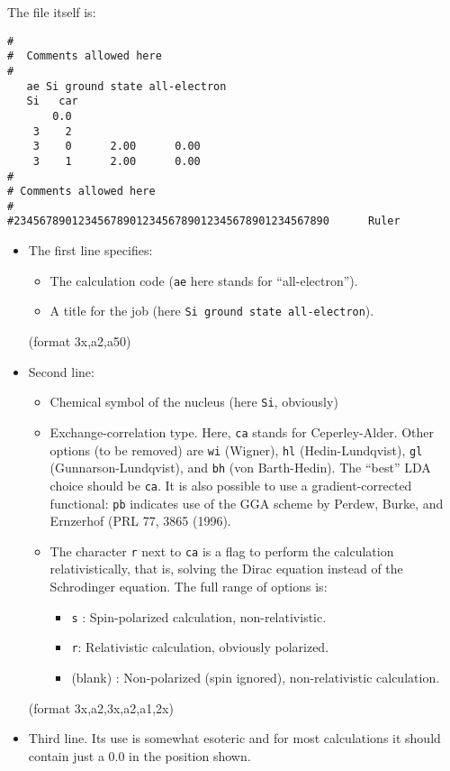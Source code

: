 \documentclass[11pt]{article}
\begin{document}
The file itself is:
\begin{verbatim}
#
#  Comments allowed here
#
   ae Si ground state all-electron
   Si   car  
       0.0
    3    2
    3    0      2.00      0.00
    3    1      2.00      0.00
#
# Comments allowed here
#
#2345678901234567890123456789012345678901234567890      Ruler
\end{verbatim}

\begin{itemize}
\item The first line specifies:
	\begin{itemize}
	\item The calculation code ({\tt ae} here stands for ``all-electron'').
	\item A title for the job (here {\tt Si ground state all-electron}).
	\end{itemize} 
	(format 3x,a2,a50)

\item Second line:
	\begin{itemize}

	\item Chemical symbol of the nucleus (here {\tt Si}, obviously)
	\item Exchange-correlation type. Here, {\tt ca} stands for
          Ceperley-Alder. Other options (to be removed) are {\tt wi}
          (Wigner), {\tt hl} (Hedin-Lundqvist), {\tt gl}
          (Gunnarson-Lundqvist), and {\tt bh} (von Barth-Hedin). The
          ``best'' LDA choice should be {\tt ca}.  It is also possible
          to use a gradient-corrected functional: {\tt pb} indicates use
          of the GGA scheme by Perdew, Burke, and Ernzerhof (PRL 77,
          3865 (1996).

	\item The character {\tt r} next to {\tt ca} is a flag to perform the
          calculation relativistically, that is, solving the Dirac equation
          instead of the Schrodinger equation. 
	  The full range of options is:
	    \begin{itemize}
		\item {\tt s} : Spin-polarized calculation, non-relativistic.
		\item {\tt r}: Relativistic calculation, obviously polarized.
		\item (blank) : Non-polarized (spin ignored), non-relativistic
           		calculation.
	    \end{itemize}
	\end{itemize}
	
	(format 3x,a2,3x,a2,a1,2x)

\item Third line. Its use is somewhat esoteric and for most
		calculations it should contain just a 0.0 in the
		position shown.
\end{itemize}
\end{document}
